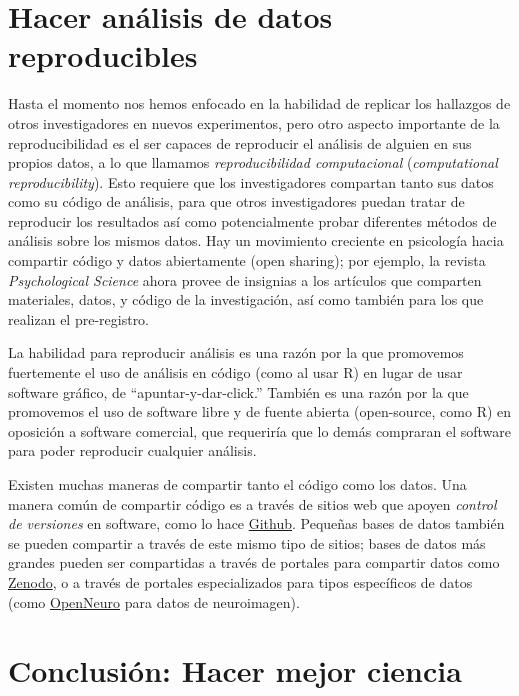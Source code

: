 \documentclass[
  12pt,
]{book}
\theoremstyle{definition}
\theoremstyle{definition}
\theoremstyle{definition}
\theoremstyle{remark}
\begin{document}
\hypertarget{hacer-anuxe1lisis-de-datos-reproducibles}{%
\section{Hacer análisis de datos reproducibles}\label{hacer-anuxe1lisis-de-datos-reproducibles}}

Hasta el momento nos hemos enfocado en la habilidad de replicar los hallazgos de otros investigadores en nuevos experimentos, pero otro aspecto importante de la reproducibilidad es el ser capaces de reproducir el análisis de alguien en sus propios datos, a lo que llamamos \emph{reproducibilidad computacional} (\emph{computational reproducibility}). Esto requiere que los investigadores compartan tanto sus datos como su código de análisis, para que otros investigadores puedan tratar de reproducir los resultados así como potencialmente probar diferentes métodos de análisis sobre los mismos datos. Hay un movimiento creciente en psicología hacia compartir código y datos abiertamente (open sharing); por ejemplo, la revista \emph{Psychological Science} ahora provee de insignias a los artículos que comparten materiales, datos, y código de la investigación, así como también para los que realizan el pre-registro.

La habilidad para reproducir análisis es una razón por la que promovemos fuertemente el uso de análisis en código (como al usar R) en lugar de usar software gráfico, de ``apuntar-y-dar-click.'' También es una razón por la que promovemos el uso de software libre y de fuente abierta (open-source, como R) en oposición a software comercial, que requeriría que lo demás compraran el software para poder reproducir cualquier análisis.

Existen muchas maneras de compartir tanto el código como los datos. Una manera común de compartir código es a través de sitios web que apoyen \emph{control de versiones} en software, como lo hace \href{http://github.com}{Github}. Pequeñas bases de datos también se pueden compartir a través de este mismo tipo de sitios; bases de datos más grandes pueden ser compartidas a través de portales para compartir datos como \href{https://zenodo.org/}{Zenodo}, o a través de portales especializados para tipos específicos de datos (como \href{http://openneuro.org}{OpenNeuro} para datos de neuroimagen).

\hypertarget{conclusiuxf3n-hacer-mejor-ciencia}{%
\section{Conclusión: Hacer mejor ciencia}\label{conclusiuxf3n-hacer-mejor-ciencia}}
\end{document}
